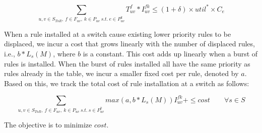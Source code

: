 \begin{scriptsize}
\begin{equation*}
    \sum _{u,v \in S_{ToR},~f \in F_{uv},~k  \in P_{uv}~s.t.~e \in P^k _{uv}} T ^f _{uv} *  I^{fk}_{uv} \leq (1 + \delta) \times util^* \times C_e 
\end{equation*}
\end{scriptsize}

  

When a rule installed at a switch cause existing lower priority rules to be displaced, we incur a cost that grows linearly with the number of displaced rules, i.e., $b * L_s(M)$, where $b$ is a constant. This cost adds up linearly when a burst of rules is installed. When the burst of rules installed all have the same priority as rules already in the table, we incur a smaller fixed cost per rule, denoted by $a$. Based on this, we track the total cost of rule installation at a switch as follows:

\begin{scriptsize}
\begin{equation*}
                       \sum_{u,v \in S_{ToR}, ~f \in F_{uv}, ~k \in
                         P_{uv} ~s.t.~ s\in P^k_{uv} } max(a, b * L_s(M)) I^{fk}_{uv}  +
                       \leq cost \quad \quad \forall s \in S
\end{equation*}
\end{scriptsize}

The objective is to minimize $cost$.   
  

